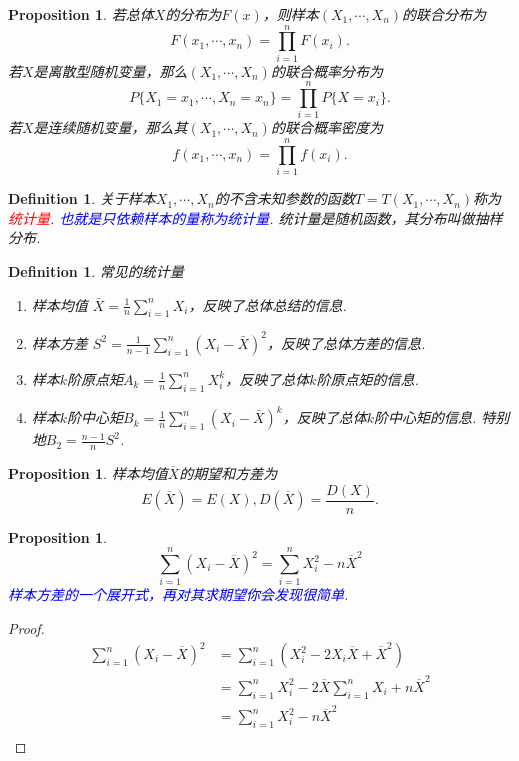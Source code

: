 \documentclass{article}
\newtheorem{proposition}[theorem]{Proposition}
\newtheorem{definition}[theorem]{Definition}
\newcommand{\redt}[1]{\textcolor{red}{#1}}
\newcommand{\bluet}[1]{\textcolor{blue}{#1}}
\begin{document}
\begin{proposition}
\rm 若总体$X$的分布为$F(x)$，则样本$(X_1,\cdots,X_n)$的联合分布为
$$
F(x_1,\cdots,x_n) = \prod\limits_{i=1}^n F(x_i).
$$
若$X$是离散型随机变量，那么$(X_1,\cdots,X_n)$的联合概率分布为
$$
P\{X_1 = x_1 ,\cdots , X_n = x_n\} = \prod\limits_{i=1}^n P\{X=x_i\}.
$$
若$X$是连续随机变量，那么其$(X_1,\cdots,X_n)$的联合概率密度为
$$
f(x_1,\cdots,x_n) = \prod\limits_{i=1}^n f(x_i).
$$
\end{proposition}

\begin{definition}
\rm 关于样本$X_1,\cdots,X_n$的不含未知参数的函数$T=T(X_1,\cdots,X_n)$称为\redt{统计量}. \bluet{也就是只依赖样本的量称为统计量}. 统计量是随机函数，其分布叫做抽样分布. 
\end{definition}

\begin{definition}
\rm 常见的统计量
\begin{enumerate}
	\item 样本均值 $\bar{X} = \frac{1}{n}\sum\limits_{i=1}^n X_i$，反映了总体总结的信息. 
	\item 样本方差 $S^2 = \frac{1}{n-1}\sum\limits_{i=1}^n(X_i-\bar{X})^2$，反映了总体方差的信息.
	\item 样本$k$阶原点矩$A_k = \frac{1}{n}\sum\limits_{i=1}^n X_i^k$，反映了总体$k$阶原点矩的信息.
	\item 样本$k$阶中心矩$B_k = \frac{1}{n}\sum\limits_{i=1}^n (X_i-\bar{X})^k$，反映了总体$k$阶中心矩的信息. 特别地$B_2 = \frac{n-1}{n}S^2$.
\end{enumerate}
\end{definition}

\begin{proposition}
\rm 样本均值$\overline{X}$的期望和方差为 
$$
E(\overline{X}) = E(X), D(\overline{X})=\frac{D(X)}{n}.
$$
\end{proposition}

\begin{proposition}\label{sample-variance-expand}
\rm 
$$
\sum\limits_{i = 1}^n (X_i - \overline{X})^2 = \sum\limits_{i = 1}^n X_i^2 -  n\overline{X}^2 
$$
\bluet{样本方差的一个展开式，再对其求期望你会发现很简单}. 
\end{proposition}

\begin{proof}
$$
\begin{array}{ll}
\sum\limits_{i = 1}^n (X_i - \overline{X})^2 &= \sum\limits_{i = 1}^n (X_i^2 - 2X_i\overline{X} + \overline{X}^2)  \\
&=  \sum\limits_{i = 1}^n X_i^2 - 2\overline{X} \sum\limits_{i = 1}^n X_i + n\overline{X}^2 \\
&= \sum\limits_{i = 1}^n X_i^2  - n\overline{X}^2\\
\end{array}
$$
\end{proof}
\end{document}
